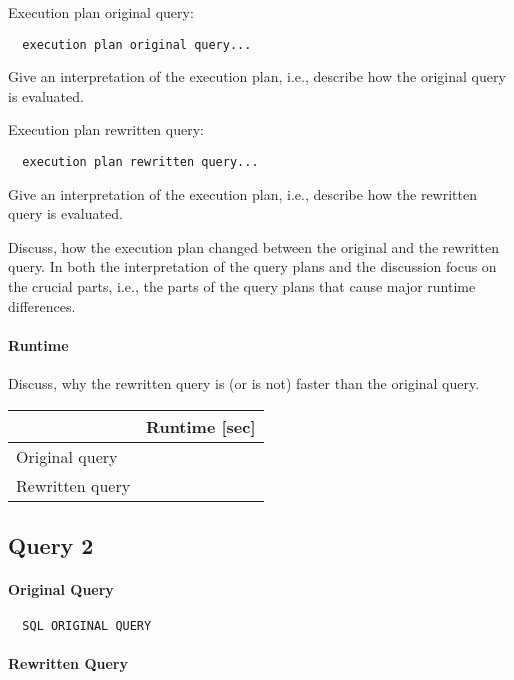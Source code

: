 \documentclass[11pt]{scrartcl}
\begin{document}
Execution plan original query:

\begin{verbatim}
  execution plan original query...
\end{verbatim}

Give an interpretation of the execution plan, i.e., describe how the
original query is evaluated.

Execution plan rewritten query:

\begin{verbatim}
  execution plan rewritten query...
\end{verbatim}

Give an interpretation of the execution plan, i.e., describe how the
rewritten query is evaluated.

Discuss, how the execution plan changed between the original and the
rewritten query. In both the interpretation of the query plans and the
discussion focus on the crucial parts, i.e., the parts of the query
plans that cause major runtime differences.

\paragraph{Runtime} Discuss, why the rewritten query is (or is not)
faster than the original query.


\begin{table}[H]
  \begin{tabular}{l|r}
    & Runtime [sec] \\
   \hline
    Original query & \\
    Rewritten query & \\
  \end{tabular}
\end{table}

\subsection*{Query 2}

\paragraph{Original Query}

{\small
\begin{verbatim}
  SQL ORIGINAL QUERY
\end{verbatim}
}

\paragraph{Rewritten Query}
\end{document}
